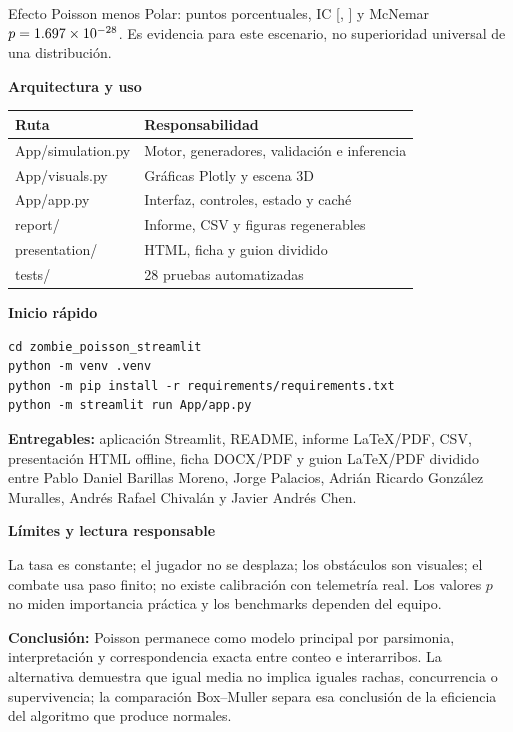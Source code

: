 \documentclass[11pt,letterpaper]{article}
\newcommand{\band}[1]{%
  \vspace{0.25em}\colorbox{ink}{\parbox{\dimexpr\textwidth-2\fboxsep}{%
  \color{white}\large\bfseries #1}}\vspace{0.35em}}
\begin{document}
Efecto Poisson menos Polar: \SurvivalDifference{} puntos porcentuales, IC
[\SurvivalDiffLow, \SurvivalDiffHigh] y McNemar $p=1.697\times 10^{-28}$. Es evidencia
para este escenario, no superioridad universal de una distribución.

\newpage
\band{Arquitectura y uso}

\begin{tabularx}{\textwidth}{>{\ttfamily}p{4.2cm}X}
\toprule
Ruta & Responsabilidad \\
\midrule
App/simulation.py & Motor, generadores, validación e inferencia \\
App/visuals.py & Gráficas Plotly y escena 3D \\
App/app.py & Interfaz, controles, estado y caché \\
report/ & Informe, CSV y figuras regenerables \\
presentation/ & HTML, ficha y guion dividido \\
tests/ & 28 pruebas automatizadas \\
\bottomrule
\end{tabularx}

\textbf{Inicio rápido}
\begin{verbatim}
cd zombie_poisson_streamlit
python -m venv .venv
python -m pip install -r requirements/requirements.txt
python -m streamlit run App/app.py
\end{verbatim}

\textbf{Entregables:} aplicación Streamlit, README, informe LaTeX/PDF, CSV,
presentación HTML offline, ficha DOCX/PDF y guion LaTeX/PDF dividido entre
Pablo Daniel Barillas Moreno, Jorge Palacios, Adrián Ricardo González Muralles,
Andrés Rafael Chivalán y Javier Andrés Chen.

\band{Límites y lectura responsable}

La tasa es constante; el jugador no se desplaza; los obstáculos son visuales;
el combate usa paso finito; no existe calibración con telemetría real. Los
valores $p$ no miden importancia práctica y los benchmarks dependen del equipo.

\textbf{Conclusión:} Poisson permanece como modelo principal por parsimonia,
interpretación y correspondencia exacta entre conteo e interarribos. La
alternativa demuestra que igual media no implica iguales rachas, concurrencia
o supervivencia; la comparación Box--Muller separa esa conclusión de la
eficiencia del algoritmo que produce normales.
\end{document}
